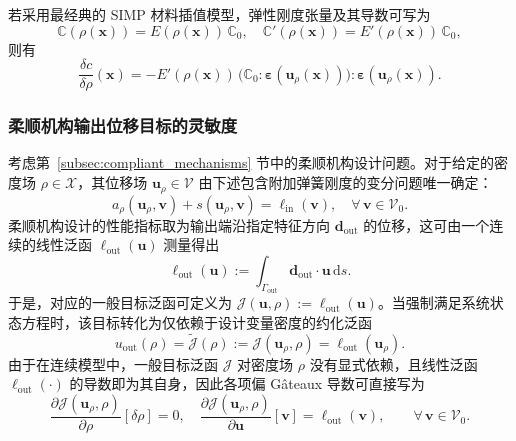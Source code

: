 若采用最经典的 SIMP 材料插值模型，弹性刚度张量及其导数可写为
\[
\mathbb{C}(\rho(\boldsymbol{x})) = E(\rho(\boldsymbol{x}))\,\mathbb{C}_0,\quad\mathbb{C}'(\rho(\boldsymbol{x})) = E'(\rho(\boldsymbol{x}))\,\mathbb{C}_0,
\]
则有
\[
\frac{\delta c}{\delta\rho}(\boldsymbol{x}) = -E'(\rho(\boldsymbol{x}))\, \big(\mathbb{C}_0:\boldsymbol{\varepsilon}(\boldsymbol{u}_\rho(\boldsymbol{x}))\big): \boldsymbol{\varepsilon}(\boldsymbol{u}_\rho(\boldsymbol{x})).
\]


\subsubsection*{柔顺机构输出位移目标的灵敏度}

考虑第~\ref{subsec:compliant_mechanisms} 节中的柔顺机构设计问题。对于给定的密度场 $\rho\in\mathcal{X}$，其位移场 $\boldsymbol{u}_\rho\in\mathcal{V}$ 由下述包含附加弹簧刚度的变分问题唯一确定：
\[
a_\rho(\boldsymbol{u}_\rho,\boldsymbol{v}) + s(\boldsymbol{u}_\rho,\boldsymbol{v}) = \ell_{\mathrm{in}}(\boldsymbol{v}),\quad \forall\,\boldsymbol{v}\in\mathcal{V}_0.
\]
柔顺机构设计的性能指标取为输出端沿指定特征方向 $\boldsymbol{d}_{\mathrm{out}}$ 的位移，这可由一个连续的线性泛函 $\ell_{\mathrm{out}}(\boldsymbol{u})$ 测量得出
\[
\ell_{\mathrm{out}}(\boldsymbol{u}) := \int_{\Gamma_{\mathrm{out}}}\boldsymbol{d}_{\mathrm{out}}\cdot\boldsymbol{u}\,\mathrm{d}s.
\]
于是，对应的一般目标泛函可定义为 $\mathcal{J}(\boldsymbol{u}, \rho) := \ell_{\mathrm{out}}(\boldsymbol{u})$。当强制满足系统状态方程时，该目标转化为仅依赖于设计变量密度的约化泛函
\[
u_{\mathrm{out}}(\rho) = \tilde{\mathcal{J}}(\rho) := \mathcal{J}(\boldsymbol{u}_\rho,\rho) = \ell_{\mathrm{out}}(\boldsymbol{u}_\rho).
\]
由于在连续模型中，一般目标泛函 $\mathcal{J}$ 对密度场 $\rho$ 没有显式依赖，且线性泛函 $\ell_{\mathrm{out}}(\cdot)$ 的导数即为其自身，因此各项偏 Gâteaux 导数可直接写为
\[
\frac{\partial\mathcal{J}(\boldsymbol{u}_\rho,\rho)}{\partial\rho}[\delta\rho] = 0,\quad\frac{\partial\mathcal{J}(\boldsymbol{u}_\rho,\rho)}{\partial\boldsymbol{u}}[\boldsymbol{v}] = \ell_{\mathrm{out}}(\boldsymbol{v}), \qquad \forall\,\boldsymbol{v}\in\mathcal{V}_0.
\]

